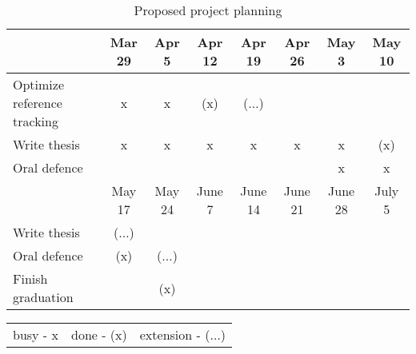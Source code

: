 \begin{table}[H]
\begin{tabular}{p{5cm}ccccccc}
                               & Mar 29 & Apr 5  & Apr 12 & Apr 19 & Apr 26 & May  3 & May 10 \\ \hline
    Optimize reference tracking     & x  &   x     &   (x)       &   ($\dots$)    &   &        &   \\ 
    Write thesis               & x   &    x     &   x   &  x &    x    &   x      &    (x)      \\ 
         Oral defence     &   &       &          &      &   &      x  &  x  \\   \hline 
    
    
                               & May 17 & May 24  & June 7 & June 14 & June 21 & June  28 & July 5 \\ \hline
    Write thesis               & ($\dots$)  &    &      &   &        &        &          \\ 
    Oral defence               &  (x)    &   ($\dots$)    &           &    &    &        &           \\    
    Finish graduation          &      &   (x)    &         &           &     &        &      \\    \hline 

 
    \end{tabular}
    \caption{Proposed project planning}
    \label{tab1:projectplanning}
\end{table}

\begin{table}[H]
    \centering
    \begin{tabular}{ccc}
       busy - x & done - (x) & extension - ($\dots$)
    \end{tabular}
\end{table}


